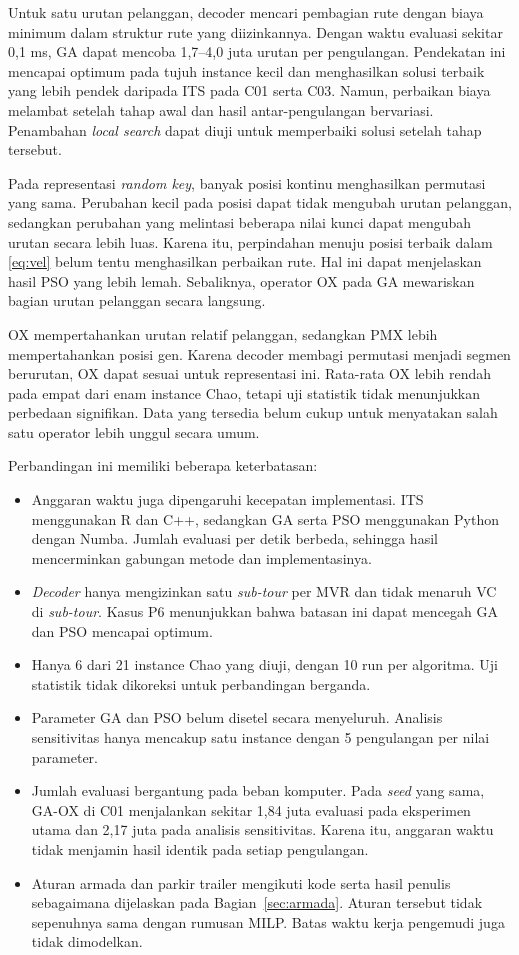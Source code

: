 \documentclass[conference]{IEEEtran}
\begin{document}
Untuk satu urutan pelanggan, decoder mencari pembagian rute dengan biaya minimum dalam struktur rute yang diizinkannya. Dengan waktu evaluasi sekitar 0,1 ms, GA dapat mencoba 1,7--4,0 juta urutan per pengulangan. Pendekatan ini mencapai optimum pada tujuh instance kecil dan menghasilkan solusi terbaik yang lebih pendek daripada ITS pada C01 serta C03. Namun, perbaikan biaya melambat setelah tahap awal dan hasil antar-pengulangan bervariasi. Penambahan \textit{local search} dapat diuji untuk memperbaiki solusi setelah tahap tersebut.

Pada representasi \textit{random key}, banyak posisi kontinu menghasilkan permutasi yang sama. Perubahan kecil pada posisi dapat tidak mengubah urutan pelanggan, sedangkan perubahan yang melintasi beberapa nilai kunci dapat mengubah urutan secara lebih luas. Karena itu, perpindahan menuju posisi terbaik dalam \eqref{eq:vel} belum tentu menghasilkan perbaikan rute. Hal ini dapat menjelaskan hasil PSO yang lebih lemah. Sebaliknya, operator OX pada GA mewariskan bagian urutan pelanggan secara langsung.

OX mempertahankan urutan relatif pelanggan, sedangkan PMX lebih mempertahankan posisi gen. Karena decoder membagi permutasi menjadi segmen berurutan, OX dapat sesuai untuk representasi ini. Rata-rata OX lebih rendah pada empat dari enam instance Chao, tetapi uji statistik tidak menunjukkan perbedaan signifikan. Data yang tersedia belum cukup untuk menyatakan salah satu operator lebih unggul secara umum.

Perbandingan ini memiliki beberapa keterbatasan:
\begin{itemize}
\item Anggaran waktu juga dipengaruhi kecepatan implementasi. ITS menggunakan R dan C++, sedangkan GA serta PSO menggunakan Python dengan Numba. Jumlah evaluasi per detik berbeda, sehingga hasil mencerminkan gabungan metode dan implementasinya.
\item \textit{Decoder} hanya mengizinkan satu \textit{sub-tour} per MVR dan tidak menaruh VC di \textit{sub-tour}. Kasus P6 menunjukkan bahwa batasan ini dapat mencegah GA dan PSO mencapai optimum.
\item Hanya 6 dari 21 instance Chao yang diuji, dengan 10 run per algoritma. Uji statistik tidak dikoreksi untuk perbandingan berganda.
\item Parameter GA dan PSO belum disetel secara menyeluruh. Analisis sensitivitas hanya mencakup satu instance dengan 5 pengulangan per nilai parameter.
\item Jumlah evaluasi bergantung pada beban komputer. Pada \textit{seed} yang sama, GA-OX di C01 menjalankan sekitar 1,84 juta evaluasi pada eksperimen utama dan 2,17 juta pada analisis sensitivitas. Karena itu, anggaran waktu tidak menjamin hasil identik pada setiap pengulangan.
\item Aturan armada dan parkir trailer mengikuti kode serta hasil penulis sebagaimana dijelaskan pada Bagian~\ref{sec:armada}. Aturan tersebut tidak sepenuhnya sama dengan rumusan MILP. Batas waktu kerja pengemudi juga tidak dimodelkan.
\end{itemize}
\end{document}
